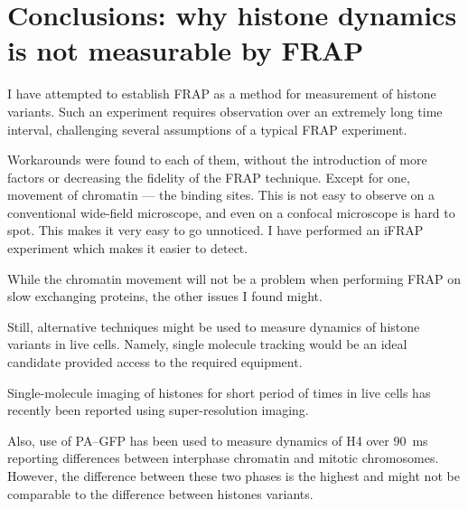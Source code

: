 \section{Conclusions: why histone dynamics is not measurable by FRAP}
  
  I have attempted to establish FRAP as a method for measurement of histone variants. Such
  an experiment requires observation over an extremely long time interval, challenging several
  assumptions of a typical FRAP experiment.
  
  Workarounds were found to each of them, without the introduction of more factors or decreasing
  the fidelity of the FRAP technique. Except for one, movement of chromatin --- the binding sites.
  This is not easy to observe on a conventional wide-field microscope, and even on a confocal
  microscope is hard to spot. This makes it very easy to go unnoticed. I have performed an iFRAP
  experiment which makes it easier to detect.
  
  While the chromatin movement will not be a problem when performing FRAP on slow exchanging
  proteins, the other issues I found might.
  
  
  Still, alternative techniques might be used to measure dynamics of histone variants in
  live cells. Namely, single molecule tracking would be an ideal candidate provided access
  to the required equipment.
  
  
  Single-molecule imaging of histones for short period of times in live cells
  has recently been reported using super-resolution imaging.
   
  Also, use of PA--GFP has been used to measure dynamics of H4 over \SI{90}{\ms} reporting
  differences between interphase chromatin and mitotic chromosomes.
  However, the difference between these two phases is the highest and might not be comparable to
  the difference between histones variants.
  
